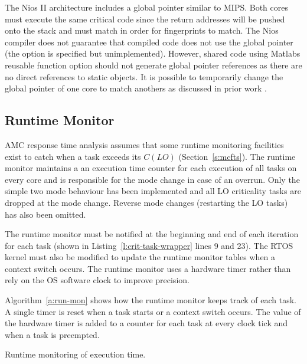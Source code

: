 
	The Nios II architecture includes a global pointer similar to MIPS. 
	Both cores must execute the same critical code since the return addresses will be pushed onto the stack and must match in order for fingerprints to match. 
	The Nios compiler does not guarantee that compiled code does not use the global pointer (the option is specified but unimplemented). 
	However, shared code using Matlabs reusable function option should not generate global pointer references as there are no direct references to static objects. 
	It is possible to temporarily change the global pointer of one core to match anothers as discussed in prior work \cite{ugthesis}.


\subsection{Runtime Monitor}

	AMC response time analysis assumes that some runtime monitoring facilities exist to catch when a task exceeds its $C(LO)$ (Section~\ref{s:mcfts}). 
	The runtime monitor maintains a an execution time counter for each execution of all tasks on every core and is responsible for the mode change in case of an overrun.
	Only the simple two mode behaviour has been implemented and all LO criticality tasks are dropped at the mode change. 
	Reverse mode changes (restarting the LO tasks) has also been omitted.

	The runtime monitor must be notified at the beginning and end of each iteration for each task (shown in Listing~\ref{l:crit-task-wrapper} lines 9 and 23). 
	The RTOS kernel must also be modified to update the runtime monitor tables when a context switch occurs. 
	The runtime monitor uses a hardware timer rather than rely on the OS software clock to improve precision.
	
	Algorithm~\ref{a:run-mon} shows how the runtime monitor keeps track of each task.
	A single timer is reset when a task starts or a context switch occurs.
	The value of the hardware timer is added to a counter for each task at every clock tick and when a task is preempted.

\begin{algorithm}
	\caption{Runtime monitoring of execution time.}
	\label{a:run-mon}
\end{algorithm}
 



